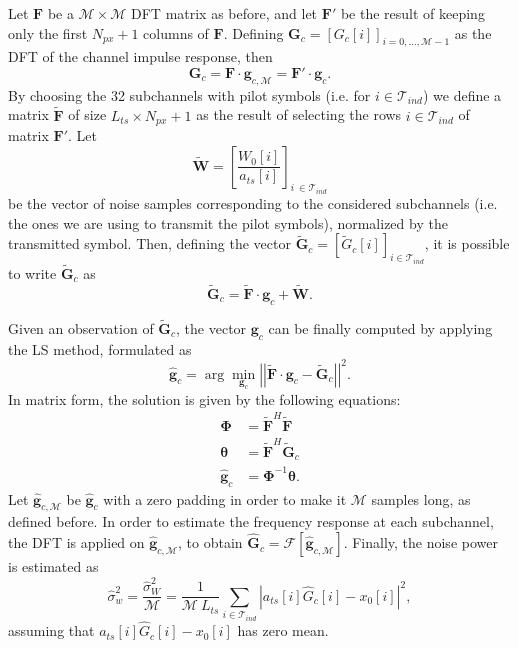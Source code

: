 \documentclass[10pt]{article}
\newcommand{\ofdM} {\mathcal{M}}
\newcommand{\DFTmat} {\mathbf{F}}
\newcommand{\DFTreduced} {\mathbf{\tilde{F}}}
\begin{document}
Let $\DFTmat$ be a $\ofdM \times \ofdM$ DFT matrix as before, and let $\DFTmat'$ be the result of keeping only the first $N_{px}+1$ columns of $\DFTmat$. Defining $\mathbf{G}_c = [ G_c[i] ]_{i = 0,\ldots,\ofdM-1}$ as the DFT of the channel impulse response, then
\begin{equation}
	\mathbf{G}_c = \DFTmat \cdot \mathbf{g}_{c,\ofdM} = \DFTmat' \cdot \mathbf{g}_c.
\end{equation}
By choosing the 32 subchannels with pilot symbols (i.e. for $ i \in \mathcal{T}_{ind}$) we define a matrix $\DFTreduced$ of size $L_{ts} \times N_{px} + 1$ as the result of selecting the rows $ i\in \mathcal{T}_{ind} $ of matrix $\DFTmat'$. Let 
\begin{equation}
	\mathbf{\tilde{W}} = \left[ \dfrac{W_0[i]}{a_{ts}[i]} \right] _{i\ \in \mathcal{T}_{ind}}
	\label{eq:ODFMnoisevarnormalized}
\end{equation}
be the vector of noise samples corresponding to the considered subchannels (i.e. the ones we are using to transmit the pilot symbols), normalized by the transmitted symbol. Then, defining the vector $\tilde{\mathbf{G}}_c = [ \tilde{G}_c[i] ]_{i\in \mathcal{T}_{ind}}$, it is possible to write $\mathbf{\tilde{G}}_c$ as
\begin{equation}
	\mathbf{\tilde{G}}_c = \DFTreduced \cdot \mathbf{g}_{c} + \mathbf{\tilde{W}}.
	\label{eq:OFDMfreqresp}
\end{equation}

Given an observation of $\tilde{\mathbf{G}}_c $, the vector $\mathbf{g}_{c}$ can be finally computed by applying the LS method, formulated as
\begin{equation}
	\mathbf{\hat{g}}_c = \arg\min_{\mathbf{g}_c} \left|\left|\DFTreduced \cdot \mathbf{g}_{c} - \tilde{\mathbf{G}}_c\right|\right|^2.
	\label{eq:OFDM_LS}
\end{equation}
In matrix form, the solution is given by the following equations:
\begin{align}
	\boldsymbol{\Phi} &= \DFTreduced^H \DFTreduced \\
	\boldsymbol{\theta} &= \DFTreduced^H \tilde{\mathbf{G}}_c \\ 
	\hat{\mathbf{g}}_{c} &= \boldsymbol{\Phi}^{-1} \boldsymbol{\theta}.
\end{align}
Let $\hat{\mathbf{g}}_{c, \ofdM}$ be $\hat{\mathbf{g}}_{c}$ with a zero padding in order to make it $\ofdM$ samples long, as defined before. In order to estimate the frequency response at each subchannel, the DFT is applied on $\hat{\mathbf{g}}_{c, \ofdM}$, to obtain $\mathbf{\hat{G}}_c = \mathcal{F}[\mathbf{\hat{g}}_{c, \ofdM}]$. 
Finally, the noise power is estimated as 
\begin{equation}
	\hat{\sigma}_w^2 = \frac{\hat{\sigma}_W^2}{\ofdM} = \frac{1}{\ofdM \: L_{ts}} \sum_{i \in \mathcal{T}_{ind}} \left| a_{ts}[i]\hat{G}_c[i] - x_0[i] \right| ^2,
	\label{eq:OFDMestimerror_firstmethod}
\end{equation}
assuming that $a_{ts}[i]\hat{G}_c[i] \! - \! x_0[i]$ has zero mean.
\end{document}
